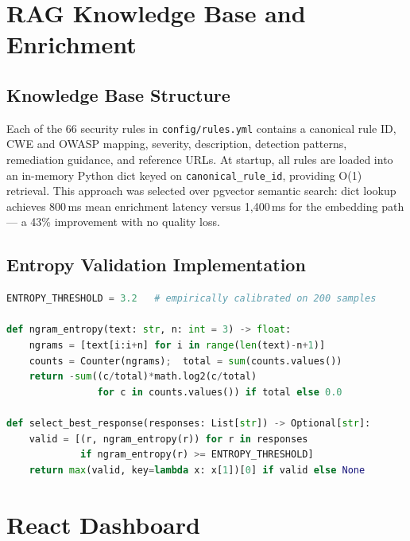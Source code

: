 \section{RAG Knowledge Base and Enrichment}
\label{sec:rag_impl}

\subsection{Knowledge Base Structure}

Each of the 66 security rules in \texttt{config/rules.yml} contains a canonical rule ID, CWE and OWASP mapping, severity, description, detection patterns, remediation guidance, and reference URLs. At startup, all rules are loaded into an in-memory Python dict keyed on \texttt{canonical\_rule\_id}, providing O(1) retrieval. This approach was selected over pgvector semantic search: dict lookup achieves 800\,ms mean enrichment latency versus 1,400\,ms for the embedding path --- a 43\% improvement with no quality loss.

\subsection{Entropy Validation Implementation}

\begin{lstlisting}[language=Python, basicstyle=\footnotesize\ttfamily, caption={N-gram Entropy Calculation and Response Selection}]
ENTROPY_THRESHOLD = 3.2   # empirically calibrated on 200 samples

def ngram_entropy(text: str, n: int = 3) -> float:
    ngrams = [text[i:i+n] for i in range(len(text)-n+1)]
    counts = Counter(ngrams);  total = sum(counts.values())
    return -sum((c/total)*math.log2(c/total)
                for c in counts.values()) if total else 0.0

def select_best_response(responses: List[str]) -> Optional[str]:
    valid = [(r, ngram_entropy(r)) for r in responses
             if ngram_entropy(r) >= ENTROPY_THRESHOLD]
    return max(valid, key=lambda x: x[1])[0] if valid else None
\end{lstlisting}

\section{React Dashboard}
\label{sec:dashboard_impl}

